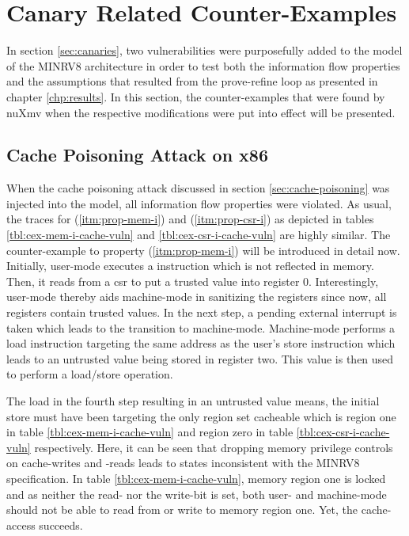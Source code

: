 \section{Canary Related Counter-Examples}
\label{app:cexs-canaries}

In section \ref{sec:canaries}, two vulnerabilities were purposefully added to the model of the MINRV8 architecture in order to test both the information flow properties and the assumptions that resulted from the prove-refine loop as presented in chapter \ref{chp:results}.
In this section, the counter-examples that were found by nuXmv when the respective modifications were put into effect will be presented.

\subsection{Cache Poisoning Attack on x86}
\label{sec:cexs-cache-vuln}

When the cache poisoning attack discussed in section \ref{sec:cache-poisoning} was injected into the model, all information flow properties were violated.
As usual, the traces for  (\ref{itm:prop-mem-i}) and  (\ref{itm:prop-csr-i}) as depicted in tables \ref{tbl:cex-mem-i-cache-vuln} and \ref{tbl:cex-csr-i-cache-vuln} are highly similar.
The counter-example to property  (\ref{itm:prop-mem-i}) will be introduced in detail now.
Initially, user-mode executes a  instruction which is not reflected in memory.
Then, it reads from a \gls{csr} to put a trusted value into register 0.
Interestingly, user-mode thereby aids machine-mode in sanitizing the registers since now, all registers contain trusted values.
In the next step, a pending external interrupt is taken which leads to the transition to machine-mode.
Machine-mode performs a load instruction targeting the same address as the user's store instruction which leads to an untrusted value being stored in register two.
This value is then used to perform a load/store operation.

The load in the fourth step resulting in an untrusted value means, the initial store must have been targeting the only region set cacheable which is region one in table \ref{tbl:cex-mem-i-cache-vuln} and region zero in table \ref{tbl:cex-csr-i-cache-vuln} respectively.
Here, it can be seen that dropping memory privilege controls on cache-writes and -reads leads to states inconsistent with the MINRV8 specification.
In table \ref{tbl:cex-mem-i-cache-vuln}, memory region one is locked and as neither the read- nor the write-bit is set, both user- and machine-mode should not be able to read from or write to memory region one.
Yet, the cache-access succeeds.


